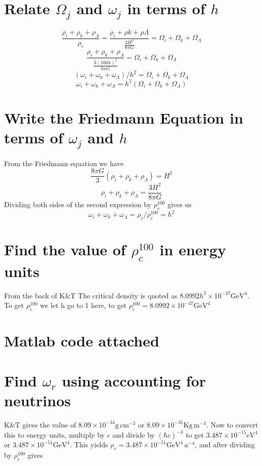 \documentclass[12pt]{article}
\begin{document}
\section{Relate $\Omega_{j}$ and $\omega_{j}$ in terms of $h$}
$$ \frac{\rho_{i} + \rho_{k} + \rho_{\Lambda}} {\rho_{c}} =  \frac{\rho_{i} + \rho{k} + \rho{\Lambda}}{\frac{3H^{2}}{8\pi G}} = \Omega_{i} + \Omega_{k} + \Omega_{\Lambda}$$
$$ \frac{\rho_{i} + \rho_{k} + \rho_{\Lambda}}{\frac{3(100 h)^{2}}{8\pi G}} = \Omega_{i} + \Omega_{k} + \Omega_{\Lambda} $$
$$ (\omega_{i} + \omega_{k} + \omega_{\Lambda})/h^{2} =  \Omega_{i} + \Omega_{k} + \Omega_{\Lambda} $$
$$ \omega_{i} + \omega_{k} + \omega_{\Lambda} = h^{2}( \Omega_{i} + \Omega_{k} + \Omega_{\Lambda}) $$

\section{Write the Friedmann Equation in terms of $\omega_{j}$ and $h$}
From the Friedmann equation we have
$$ \frac{8\pi G}{3}( \rho_{i} + \rho_{k} + \rho_{\Lambda}) = H^{2}$$
$$\rho_{i} + \rho_{k} + \rho_{\Lambda} = \frac{3H^{2}}{8\pi G}$$
Dividing both sides of the second expression by $\rho^{100}_{c}$ gives us
$$\omega_{i} + \omega_{k} + \omega_{\Lambda} = \rho_{c} / \rho^{100}_{c} = h^{2}$$

\section{Find the value of $\rho^{100}_{c}$ in energy units}
From the back of K\&T The critical density is quoted as $8.0992h^{2} \times 10^{-47} \mathrm{GeV}^{4}$. To get $\rho^{100}_{c}$ we let h go to 1 here, to get
$\rho^{100}_{c} = 8.0992 \times 10^{-47} \mathrm{GeV}^{4}$

\section{Matlab code attached}

\section{Find $\omega_{r}$ using accounting for neutrinos}
K\&T gives the value of $8.09 \times 10^{-34} \mathrm{g} \, \mathrm{cm}^{-3}$ or $8.09 \times 10^{-31} \mathrm{Kg} \, \mathrm{m}^{-3}$. Now to convert this to energy units, multiply by $c$ and divide by  $(\hbar c)^{-3}$ to get $3.487 \times 10^{-15} \mathrm{eV}^{4}$ or $3.487 \times 10^{-51} \mathrm{GeV}^{4}$. This yields $\rho_{r} = 3.487 \times 10^{-51} \mathrm{GeV}^{4} \, a^{-4}$, and after dividing by  $\rho^{100}_{c}$ gives
\end{document}
